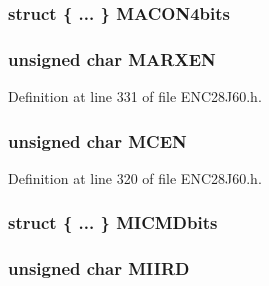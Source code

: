 \subsubsection[{M\+A\+C\+O\+N4bits}]{\setlength{\rightskip}{0pt plus 5cm}struct \{ ... \}   M\+A\+C\+O\+N4bits}\label{union___r_e_g_ab2d713dd36da03d839fb5ed4e3140422}
\hypertarget{union___r_e_g_a382baa3b20581546cf3df0fda5865fff}{}
\subsubsection[{M\+A\+R\+X\+E\+N}]{\setlength{\rightskip}{0pt plus 5cm}unsigned {\bf char} M\+A\+R\+X\+E\+N}\label{union___r_e_g_a382baa3b20581546cf3df0fda5865fff}


Definition at line 331 of file E\+N\+C28\+J60.\+h.

\hypertarget{union___r_e_g_a7f305c005ab95dec1f049c3f4d05b0f5}{}
\subsubsection[{M\+C\+E\+N}]{\setlength{\rightskip}{0pt plus 5cm}unsigned {\bf char} M\+C\+E\+N}\label{union___r_e_g_a7f305c005ab95dec1f049c3f4d05b0f5}


Definition at line 320 of file E\+N\+C28\+J60.\+h.

\hypertarget{union___r_e_g_aea9982000d3bcc15f1355fe540cb9e0a}{}
\subsubsection[{M\+I\+C\+M\+Dbits}]{\setlength{\rightskip}{0pt plus 5cm}struct \{ ... \}   M\+I\+C\+M\+Dbits}\label{union___r_e_g_aea9982000d3bcc15f1355fe540cb9e0a}
\hypertarget{union___r_e_g_a9187ac0db6318dc5150c72b5ec38bf75}{}
\subsubsection[{M\+I\+I\+R\+D}]{\setlength{\rightskip}{0pt plus 5cm}unsigned {\bf char} M\+I\+I\+R\+D}\label{union___r_e_g_a9187ac0db6318dc5150c72b5ec38bf75}


